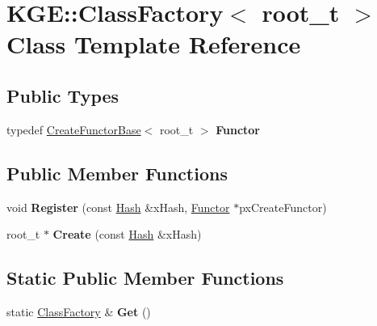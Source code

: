 \hypertarget{class_k_g_e_1_1_class_factory}{\section{K\-G\-E\-:\-:Class\-Factory$<$ root\-\_\-t $>$ Class Template Reference}
\label{class_k_g_e_1_1_class_factory}
}
\subsection*{Public Types}
\begin{DoxyCompactItemize}
\item 
\hypertarget{class_k_g_e_1_1_class_factory_af5f63e0339440a3eb0189b222b778f9b}{typedef \hyperlink{class_k_g_e_1_1_create_functor_base}{Create\-Functor\-Base}$<$ root\-\_\-t $>$ {\bfseries Functor}}\label{class_k_g_e_1_1_class_factory_af5f63e0339440a3eb0189b222b778f9b}

\end{DoxyCompactItemize}
\subsection*{Public Member Functions}
\begin{DoxyCompactItemize}
\item 
\hypertarget{class_k_g_e_1_1_class_factory_a20ea1b618be5137db62f37b4a5533a9e}{void {\bfseries Register} (const \hyperlink{class_k_g_e_1_1_hash}{Hash} \&x\-Hash, \hyperlink{class_k_g_e_1_1_create_functor_base}{Functor} $\ast$px\-Create\-Functor)}\label{class_k_g_e_1_1_class_factory_a20ea1b618be5137db62f37b4a5533a9e}

\item 
\hypertarget{class_k_g_e_1_1_class_factory_a43c905623c97d5984b232b533a0ebb22}{root\-\_\-t $\ast$ {\bfseries Create} (const \hyperlink{class_k_g_e_1_1_hash}{Hash} \&x\-Hash)}\label{class_k_g_e_1_1_class_factory_a43c905623c97d5984b232b533a0ebb22}

\end{DoxyCompactItemize}
\subsection*{Static Public Member Functions}
\begin{DoxyCompactItemize}
\item 
\hypertarget{class_k_g_e_1_1_class_factory_a12d3ef7f2deeecc39f5a336cabc0abad}{static \hyperlink{class_k_g_e_1_1_class_factory}{Class\-Factory} \& {\bfseries Get} ()}\label{class_k_g_e_1_1_class_factory_a12d3ef7f2deeecc39f5a336cabc0abad}

\end{DoxyCompactItemize}
